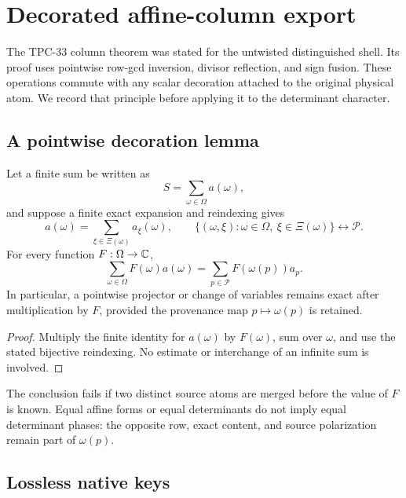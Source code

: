 \section{Decorated affine-column export}
\label{sec:decorated-affine-export}

The TPC-33 column theorem was stated for the untwisted distinguished
shell.  Its proof uses pointwise row-gcd inversion, divisor
reflection, and sign fusion.  These operations commute with any
scalar decoration attached to the original physical atom.  We record
that principle before applying it to the determinant character.

\subsection{A pointwise decoration lemma}

\begin{lemma}
\label{lem:decorated-reindexing}
Let a finite sum be written as
\[
 S=\sum_{\omega\in\Omega}a(\omega),
\]
and suppose a finite exact expansion and reindexing gives
\[
 a(\omega)
 =
 \sum_{\xi\in\Xi(\omega)}a_\xi(\omega),\qquad
 \{(\omega,\xi):\omega\in\Omega,\ \xi\in\Xi(\omega)\}
 \longleftrightarrow\mathcal P.
\]
For every function \(F:\Omega\to\mathbb C\),
\[
 \sum_{\omega\in\Omega}F(\omega)a(\omega)
 =
 \sum_{p\in\mathcal P}
 F(\omega(p))a_p.
\]
In particular, a pointwise projector or change of variables remains
exact after multiplication by \(F\), provided the provenance map
\(p\mapsto\omega(p)\) is retained.
\end{lemma}

\begin{proof}
Multiply the finite identity for \(a(\omega)\) by \(F(\omega)\), sum
over \(\omega\), and use the stated bijective reindexing.  No
estimate or interchange of an infinite sum is involved.
\end{proof}

\begin{remark}
The conclusion fails if two distinct source atoms are merged before
the value of \(F\) is known.  Equal affine forms or equal
determinants do not imply equal determinant phases: the opposite row,
exact content, and source polarization remain part of
\(\omega(p)\).
\end{remark}

\subsection{Lossless native keys}

